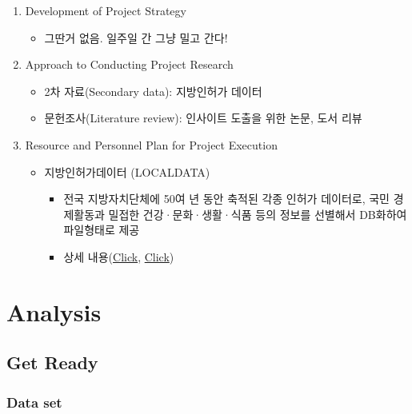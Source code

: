 \documentclass[
]{book}
\providecommand{\tightlist}{%
  \setlength{\itemsep}{0pt}\setlength{\parskip}{0pt}}
\begin{document}
\begin{enumerate}
\def\labelenumi{\arabic{enumi}.}
\item
  Development of Project Strategy

  \begin{itemize}
  \tightlist
  \item
    그딴거 없음. 일주일 간 그냥 밀고 간다!
  \end{itemize}
\item
  Approach to Conducting Project Research

  \begin{itemize}
  \item
    2차 자료(Secondary data): 지방인허가 데이터
  \item
    문헌조사(Literature review): 인사이트 도출을 위한 논문, 도서 리뷰
  \end{itemize}
\item
  Resource and Personnel Plan for Project Execution

  \begin{itemize}
  \item
    지방인허가데이터 (LOCALDATA)

    \begin{itemize}
    \item
      전국 지방자치단체에 50여 년 동안 축적된 각종 인허가 데이터로, 국민 경제활동과 밀접한 건강·문화·생활·식품 등의 정보를 선별해서 DB화하여 파일형태로 제공
    \item
      상세 내용(\href{https://www.data.go.kr/tcs/eds/selectCoreDataView.do?coreDataInsttCode=1740000\&coreDataSn=1}{Click}, \href{https://www.mois.go.kr/frt/bbs/type010/commonSelectBoardArticle.do?bbsId=BBSMSTR_000000000008\&nttId=46231}{Click})
    \end{itemize}
  \end{itemize}
\end{enumerate}

\hypertarget{analysis}{%
\chapter{Analysis}\label{analysis}}

\hypertarget{get-ready}{%
\section{Get Ready}\label{get-ready}}

\hypertarget{data-set}{%
\subsection{Data set}\label{data-set}}
\end{document}
